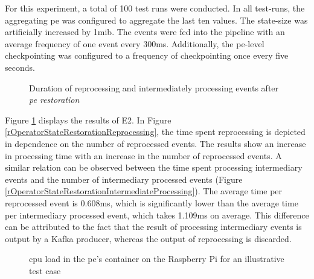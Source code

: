 For this experiment, a total of 100 test runs were conducted. In all test-runs, the aggregating \gls{pe} was configured to aggregate the last ten values. The state-size was artificially increased by 1\gls{mib}. The events were fed into the pipeline with an average frequency of one event every 300ms. Additionally, the \gls{pe}-level checkpointing was configured to a frequency of checkpointing once every five seconds.\par


\begin{figure}[!ht]
    \centering
    \caption{Duration of reprocessing and intermediately processing events after \textit{\acrshort{pe} restoration}}%
    \label{rOperatorStateRestorationDuration}%
\end{figure}


Figure \ref{rOperatorStateRestorationDuration} displays the results of E2. In Figure \ref{rOperatorStateRestorationReprocessing}, the time spent reprocessing is depicted in dependence on the number of reprocessed events. The results show an increase in processing time with an increase in the number of reprocessed events. A similar relation can be observed between the time spent processing intermediary events and the number of intermediary processed events (Figure \ref{rOperatorStateRestorationIntermediateProcessing}). The average time per reprocessed event is 0.608ms, which is significantly lower than the average time per intermediary processed event, which takes 1.109ms on average. This difference can be attributed to the fact that the result of processing intermediary events is output by a Kafka producer, whereas the output of reprocessing is discarded.\par

\begin{figure}[!ht]
    \centering
    \graphicspath{{./figures/code/}}
    
    \caption{\gls{cpu} load in the \gls{pe}'s container on the Raspberry Pi for an illustrative test case}
    \label{rOperatorStateRestorationCPU}
\end{figure}

